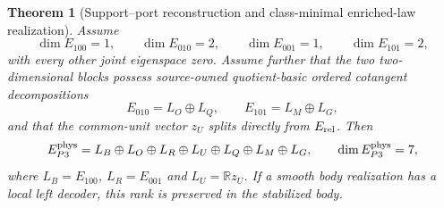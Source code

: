 \documentclass[11pt]{article}
\newtheorem{theorem}{Theorem}
\begin{document}
\begin{theorem}[Support--port reconstruction and class-minimal enriched-law realization]
\label{thm:p3supportportparent}
Assume
\begin{equation}
 \dim E_{100}=1,\qquad \dim E_{010}=2,\qquad
 \dim E_{001}=1,\qquad \dim E_{101}=2,
 \label{eq:p3supportmultiplicities}
\end{equation}
with every other joint eigenspace zero.  Assume further that the two
two-dimensional blocks possess source-owned quotient-basic ordered
cotangent decompositions
\begin{equation}
 E_{010}=L_O\oplus L_Q,
 \qquad E_{101}=L_M\oplus L_G,
 \label{eq:p3orderedports}
\end{equation}
and that the common-unit vector $z_U$ splits directly from $E_{\rm rel}$.
Then
\begin{equation}
 E_{P3}^{\rm phys}
 =L_B\oplus L_O\oplus L_R\oplus L_U
  \oplus L_Q\oplus L_M\oplus L_G,
 \qquad \dim E_{P3}^{\rm phys}=7,
 \label{eq:p3supportportrankseven}
\end{equation}
where $L_B=E_{100}$, $L_R=E_{001}$ and $L_U=\mathbb Rz_U$.
If a smooth body realization has a local left decoder, this rank is
preserved in the stabilized body.


\end{theorem}
\end{document}
